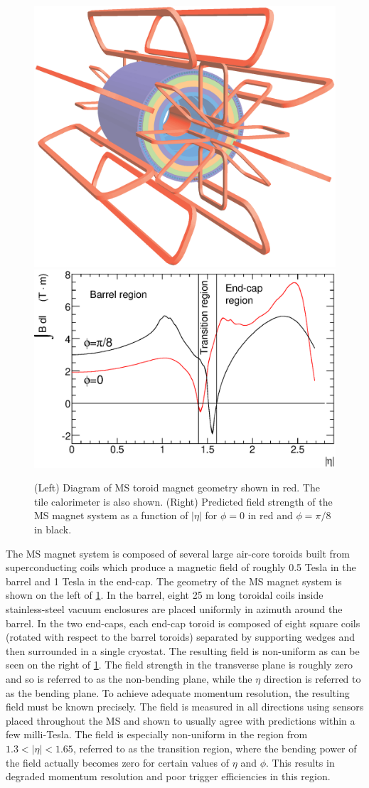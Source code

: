 \begin{figure}[ht]
\centering
\includegraphics[width=.495\textwidth]{figures/atlas/magnet}
\includegraphics[width=.495\textwidth]{figures/atlas/toroid_magnet_field}
\caption{(Left) Diagram of MS toroid magnet geometry shown in red. The
tile calorimeter is also shown.
(Right) Predicted field strength of the MS magnet 
system as a function of $|\eta|$
for $\phi=0$ in red  and $\phi=\pi/8$ in black.}
\label{fig:atlas_toroid_magnet}
\end{figure}


The MS magnet system is composed of several large air-core toroids built
from superconducting coils which produce a magnetic field of 
roughly 0.5 Tesla in the barrel and 1 Tesla in the end-cap. 
The geometry of the MS magnet system is shown 
on the left of \fig\ref{fig:atlas_toroid_magnet}. In the barrel, 
eight 25 m long toroidal 
coils inside stainless-steel vacuum enclosures are placed uniformly in 
azimuth around the barrel. In the two end-caps, 
each end-cap toroid is composed of 
eight square coils (rotated with respect to the barrel toroids)
separated by supporting wedges and then surrounded in a single 
cryostat.
The resulting field is non-uniform as can be seen on the right
of \fig\ref{fig:atlas_toroid_magnet}. 
The field strength in the transverse plane is roughly zero and so is referred
to as the non-bending plane, while the $\eta$ direction is referred to as the
bending plane.
To achieve adequate momentum resolution, the resulting field must be known
precisely.
The field is measured in all directions using sensors placed throughout
the MS and shown to usually agree with predictions within a few milli-Tesla.
The field is especially non-uniform in the region from 
$1.3 < |\eta| < 1.65$, referred to as the transition region, 
where the bending power of the field actually becomes zero
for certain values of $\eta$ and $\phi$.
This results in degraded momentum resolution and poor trigger efficiencies
in this region.


